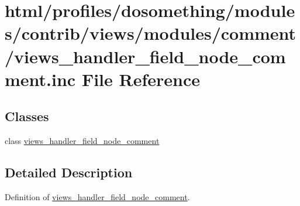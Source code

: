 \hypertarget{views__handler__field__node__comment_8inc}{
\section{html/profiles/dosomething/modules/contrib/views/modules/comment/views\_\-handler\_\-field\_\-node\_\-comment.inc File Reference}
\label{views__handler__field__node__comment_8inc}
}
\subsection*{Classes}
\begin{DoxyCompactItemize}
\item 
class \hyperlink{classviews__handler__field__node__comment}{views\_\-handler\_\-field\_\-node\_\-comment}
\end{DoxyCompactItemize}


\subsection{Detailed Description}
Definition of \hyperlink{classviews__handler__field__node__comment}{views\_\-handler\_\-field\_\-node\_\-comment}. 